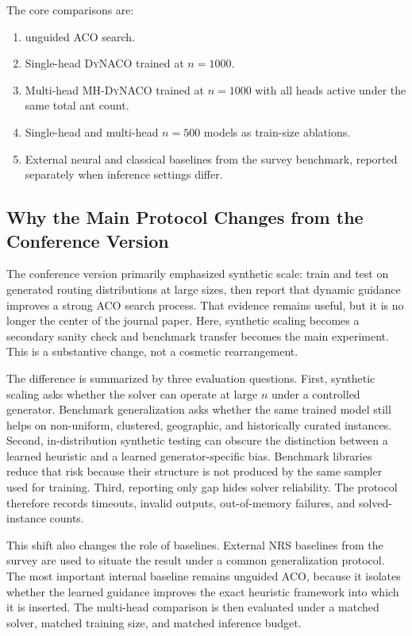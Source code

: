 \documentclass[11pt]{article}
\newcommand{\DyNACO}{\textsc{DyNACO}}
\newcommand{\MHDyNACO}{\textsc{MH-DyNACO}}
\begin{document}
The core comparisons are:
\begin{enumerate}
    \item unguided ACO search.
    \item Single-head \DyNACO{} trained at $n=1000$.
    \item Multi-head \MHDyNACO{} trained at $n=1000$ with all heads active under the same total ant count.
    \item Single-head and multi-head $n=500$ models as train-size ablations.
    \item External neural and classical baselines from the survey benchmark, reported separately when inference settings differ.
\end{enumerate}

\subsection{Why the Main Protocol Changes from the Conference Version}
\label{sec:protocol-shift}

The conference version primarily emphasized synthetic scale: train and test on generated routing distributions at large sizes, then report that dynamic guidance improves a strong ACO search process.
That evidence remains useful, but it is no longer the center of the journal paper.
Here, synthetic scaling becomes a secondary sanity check and benchmark transfer becomes the main experiment.
This is a substantive change, not a cosmetic rearrangement.

The difference is summarized by three evaluation questions.
First, synthetic scaling asks whether the solver can operate at large $n$ under a controlled generator.
Benchmark generalization asks whether the same trained model still helps on non-uniform, clustered, geographic, and historically curated instances.
Second, in-distribution synthetic testing can obscure the distinction between a learned heuristic and a learned generator-specific bias.
Benchmark libraries reduce that risk because their structure is not produced by the same sampler used for training.
Third, reporting only gap hides solver reliability.
The protocol therefore records timeouts, invalid outputs, out-of-memory failures, and solved-instance counts.

This shift also changes the role of baselines.
External NRS baselines from the survey are used to situate the result under a common generalization protocol.
The most important internal baseline remains unguided ACO, because it isolates whether the learned guidance improves the exact heuristic framework into which it is inserted.
The multi-head comparison is then evaluated under a matched solver, matched training size, and matched inference budget.
\end{document}

